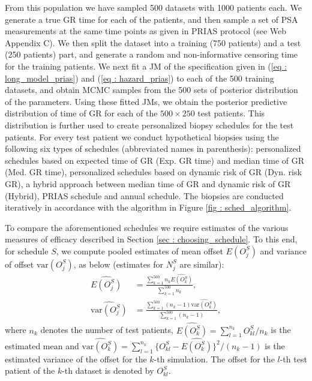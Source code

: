 From this population we have sampled 500 datasets with 1000 patients each. We generate a true GR time for each of the patients, and then sample a set of PSA measurements at the same time points as given in PRIAS protocol (see Web Appendix C). We then split the dataset into a training (750 patients) and a test (250 patients) part, and generate a random and non-informative censoring time for the training patients. We next fit a JM of the specification given in (\ref{eq : long_model_prias}) and (\ref{eq : hazard_prias}) to each of the 500 training datasets, and obtain MCMC samples from the 500 sets of posterior distribution of the parameters. Using these fitted JMs, we obtain the posterior predictive distribution of time of GR for each of the $500 \times 250$ test patients. This distribution is further used to create personalized biopsy schedules for the test patients. For every test patient we conduct hypothetical biopsies using the following six types of schedules (abbreviated names in parenthesis): personalized schedules based on expected time of GR (Exp. GR time) and median time of GR (Med. GR time), personalized schedules based on dynamic risk of GR (Dyn. risk GR), a hybrid approach between median time of GR and dynamic risk of GR (Hybrid), PRIAS schedule and annual schedule. The biopsies are conducted iteratively in accordance with the algorithm in Figure \ref{fig : sched_algorithm}. 

To compare the aforementioned schedules we require estimates of the various measures of efficacy described in Section \ref{sec : choosing_schedule}. To this end, for schedule $S$, we compute pooled estimates of mean offset $E(O^S_j)$ and variance of offset $\mbox{var}(O^S_j)$, as below (estimates for $N^S_j$ are similar):
\begin{align*}
\widehat{E(O^S_j)} &= \frac{\sum_{k=1}^{500} n_k \widehat{E(O^S_k)}}{\sum_{k=1}^{500} n_k}, \\
\widehat{\mbox{var}(O^S_j)} &= \frac{\sum_{k=1}^{500} (n_k - 1) \widehat{\mbox{var}(O^S_k)}}{\sum_{k=1}^{500} (n_k-1)}, 
\end{align*}
where $n_k$ denotes the number of test patients, $\widehat{E(O^S_k)} = {\sum_{l=1}^{n_k}O^S_{kl}}/{n_k}$ is the estimated mean and $\widehat{\mbox{var}(O^S_k)} = {\sum_{l=1}^{n_k}\big\{O^S_{kl} - \widehat{E(O^S_k)}\big\}^2}/(n_k-1)$ is the estimated variance of the offset for the $k$-th simulation. The offset for the $l$-th test patient of the $k$-th dataset is denoted by $O^S_{kl}$.


